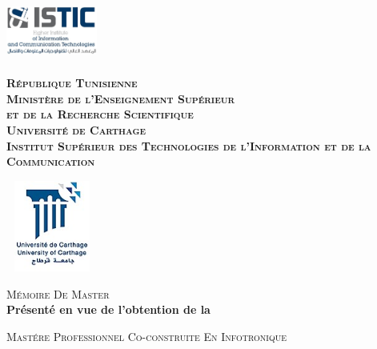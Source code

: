 \begin{titlepage}

\newcommand{\HRule}{\rule{\linewidth}{0.5mm}} %

\center %
 


\begin{minipage}[l]{0.2\columnwidth}
\includegraphics[width=3cm,height=2cm]{logo_istic.jpg}\\
\end{minipage}
\hfill
\begin{minipage}[l]{0.5\columnwidth}
\centering
\footnotesize
\textbf{\textsc{République Tunisienne}}\\
\textbf{\textsc{Ministère de l'Enseignement Supérieur\\
et de la Recherche Scientifique}}\\
\medskip 
\textbf{\textsc{Université de Carthage}}\\
\medskip 
\textbf{\textsc{Institut Supérieur des Technologies de l'Information et de la Communication}}
\end{minipage}
\hfill
\begin{minipage}[l]{0.2\columnwidth}
\includegraphics[width=3cm,height=3cm]{universite-carthage.jpg}\\
\end{minipage}

\vskip1cm
\textsc{\large Mémoire De Master}\\[0.5cm] %

\textbf{Présenté en vue de l'obtention de la}

\textsc{\large Mastére Professionnel Co-construite En Infotronique
}\\[0.5cm] %


\end{titlepage}

